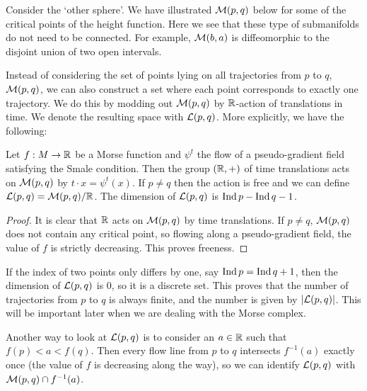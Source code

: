 \begin{eg}
    Consider the `other sphere'. 
    We have illustrated $\mathcal M(p, q)$ below for some of the critical points of the height function.
    Here we see that these type of submanifolds do not need to be connected. For example, $\mathcal M(b, a)$ is diffeomorphic to the disjoint union of two open intervals.
\end{eg}

Instead of considering the set of points lying on all trajectories from $p$ to $q$, $\mathcal M(p, q)$, we can also construct a set where each point corresponds to exactly one trajectory.
We do this by modding out $\mathcal M(p, q)$ by $\mathbb{R}$-action of translations in time. We denote the resulting space with $\mathcal L(p, q)$.
More explicitly, we have the following:

\begin{prop}
    Let $f: M \to  \mathbb{R}$ be a Morse function and $\psi^{t}$ the flow of a pseudo-gradient field satisfying the Smale condition.
    Then the group $(\mathbb{R}, +)$ of time translations acts on $\mathcal M(p, q)$ by  $t \cdot x = \psi^{t}(x)$.  If $p \neq q$ then the action is free and we can define $ \mathcal L(p, q) = \mathcal M(p, q) / \mathbb{R} $. The dimension of $\mathcal L(p, q)$ is $\operatorname{Ind} p - \operatorname{Ind} q - 1$.
\end{prop}
\begin{proof}
    It is clear that $\mathbb{R}$ acts on $\mathcal M(p, q)$ by time translations. 
    If $p \neq q$,  $\mathcal M(p, q)$ does not contain any critical point, so flowing along a pseudo-gradient field, the value of $f$ is strictly decreasing. This proves freeness.
\end{proof}

\begin{remark}
    If the index of two points only differs by one, say $\operatorname{Ind} p = \operatorname{Ind} q + 1$, then the dimension of $\mathcal L(p, q)$ is $0$, so it is a discrete set.
    This proves that the number of trajectories from $p$ to $q$ is always finite, and the number is given by $| \mathcal L(p, q)|$.
    This will be important later when we are dealing with the Morse complex.
\end{remark}
\begin{remark}
    Another way to look at $\mathcal L(p, q)$ is to consider an $a \in \mathbb{R}$ such that $f(p)<a<f(q)$. Then every flow line from $p$ to $q$  intersects $f^{-1}(a)$ exactly once (the value of $f$ is decreasing along the way), so we can identify  $\mathcal L(p, q)$ with  $\mathcal M(p, q) \cap f^{-1}(a)$.
\end{remark}




